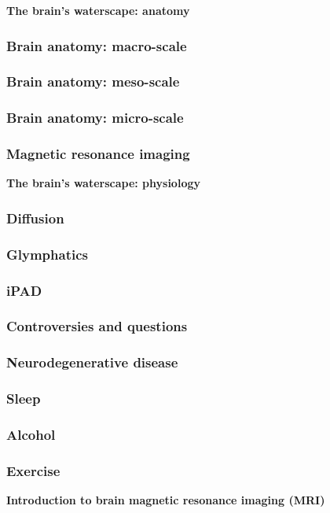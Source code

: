 \documentclass[mathserif, aspectratio=169]{beamer}
\newcommand{\mysection}[1]{\begin{frame} \begin{center} \vspace{3em} \textbf{#1} \end{center} \end{frame}}
\begin{document}
%
% 
%

\mysection{The brain's waterscape: anatomy}

\begin{frame}
  \frametitle{Brain anatomy: macro-scale}
\end{frame}

\begin{frame}
  \frametitle{Brain anatomy: meso-scale}
\end{frame}

\begin{frame}
  \frametitle{Brain anatomy: micro-scale}
\end{frame}

\begin{frame}
  \frametitle{Magnetic resonance imaging}
\end{frame}

\mysection{The brain's waterscape: physiology}

\begin{frame}
  \frametitle{Diffusion}
\end{frame}

\begin{frame}
  \frametitle{Glymphatics}
\end{frame}

\begin{frame}
  \frametitle{iPAD}
\end{frame}

\begin{frame}
  \frametitle{Controversies and questions}
\end{frame}


\begin{frame}
  \frametitle{Neurodegenerative disease}
\end{frame}

\begin{frame}
  \frametitle{Sleep}
\end{frame}

\begin{frame}
  \frametitle{Alcohol}
\end{frame}

\begin{frame}
  \frametitle{Exercise}
\end{frame}

\mysection{Introduction to brain magnetic resonance imaging (MRI)}
\end{document}
